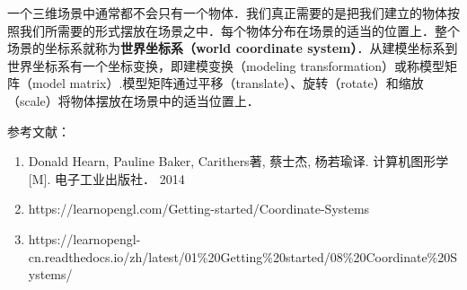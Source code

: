 

一个三维场景中通常都不会只有一个物体．我们真正需要的是把我们建立的物体按照我们所需要的形式摆放在场景之中．每个物体分布在场景的适当的位置上．整个场景的坐标系就称为\textbf{世界坐标系（world coordinate system）}．从建模坐标系到世界坐标系有一个坐标变换，即建模变换（modeling transformation）或称模型矩阵（model matrix）.模型矩阵通过平移（translate）、旋转（rotate）和缩放（scale）将物体摆放在场景中的适当位置上．




参考文献：
\begin{enumerate}
\item Donald Hearn, Pauline Baker, Carithers著, 蔡士杰, 杨若瑜译. 计算机图形学[M]. 电子工业出版社． 2014
\item https://learnopengl.com/Getting-started/Coordinate-Systems
\item https://learnopengl-cn.readthedocs.io/zh/latest/01\%20Getting\%20started/08\%20Coordinate\%20Systems/
\end{enumerate}